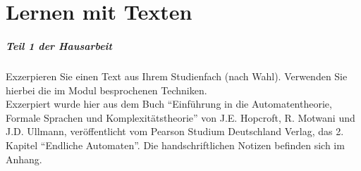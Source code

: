 %
\chapter{Lernen mit Texten}
\label{sec:lernen-mit-texten}

\paragraph{Teil 1 der Hausarbeit}
Exzerpieren Sie einen Text aus Ihrem Studienfach (nach Wahl). Verwenden Sie hierbei die im Modul besprochenen Techniken. \\[0.4em]

Exzerpiert wurde hier aus dem Buch “Einführung in die Automatentheorie, Formale Sprachen und Komplexitätstheorie” von J.E. Hopcroft, R. Motwani und J.D. Ullmann, veröffentlicht vom Pearson Studium Deutschland Verlag, das 2. Kapitel “Endliche Automaten”.
Die handschriftlichen Notizen befinden sich im Anhang.
